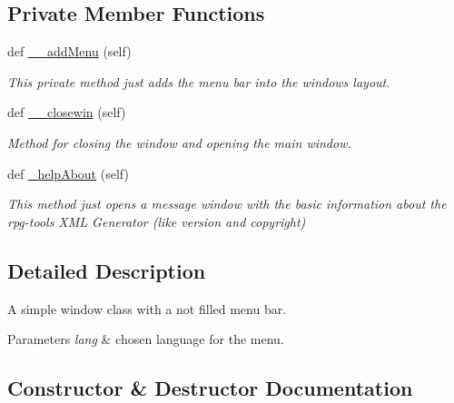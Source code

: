 \subsection*{Private Member Functions}
\begin{DoxyCompactItemize}
\item 
def \mbox{\hyperlink{classbackpack_1_1src_1_1gui_1_1window_1_1blankWindow_a6069616fddec73cdedeca6b39175887d}{\+\_\+\+\_\+add\+Menu}} (self)
\begin{DoxyCompactList}\small\item\em This private method just adds the menu bar into the window\textquotesingle{}s layout. \end{DoxyCompactList}\item 
def \mbox{\hyperlink{classbackpack_1_1src_1_1gui_1_1window_1_1blankWindow_a6c20cb6477ad16c8bdb83537848c6029}{\+\_\+\+\_\+closewin}} (self)
\begin{DoxyCompactList}\small\item\em Method for closing the window and opening the main window. \end{DoxyCompactList}\item 
def \mbox{\hyperlink{classbackpack_1_1src_1_1gui_1_1window_1_1blankWindow_aba422042633b8db7eca93d9743b5c206}{\+\_\+help\+About}} (self)
\begin{DoxyCompactList}\small\item\em This method just opens a message window with the basic information about the rpg-\/tools X\+ML Generator (like version and copyright) \end{DoxyCompactList}\end{DoxyCompactItemize}


\subsection{Detailed Description}
A simple window class with a not filled menu bar. 


\begin{DoxyParams}{Parameters}
{\em lang} & chosen language for the menu. \\
\hline
\end{DoxyParams}


\subsection{Constructor \& Destructor Documentation}
\mbox{\label{classbackpack_1_1src_1_1gui_1_1window_1_1blankWindow_a20b59d972f327eb73df9cc8a51e69a3c}} 
